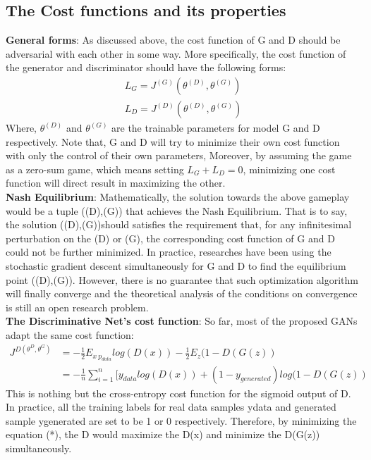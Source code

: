 \documentclass[10pt,twocolumn,letterpaper]{article}
\begin{document}
\subsection{The Cost functions and its properties  }
\textbf{General forms}: As discussed above, the cost function of G and D should be adversarial with each other in some way. More specifically, the cost function of the generator and discriminator should have the following forms:
\begin{align}
L_G = J^{(G)}(\theta^{(D)},\theta^{(G)})\\
L_D = J^{(D)}(\theta^{(D)},\theta^{(G)})
\end{align}
Where, $\theta^{(D)}$ and $\theta^{(G)}$ are the trainable parameters for model G and D respectively. Note that, G and D will try to minimize their own cost function with only the control of their own parameters, Moreover, by assuming the game as a zero-sum game, which means setting $L_G+ L_D =  0$, minimizing one cost function will direct result in maximizing the other.\\

\textbf{Nash Equilibrium}:
Mathematically, the solution towards the above gameplay would be a tuple ((D),(G)) that achieves the Nash Equilibrium. That is to say, the solution ((D),(G))should satisfies the requirement that, for any infinitesimal perturbation on the (D) or  (G), the corresponding cost function of G and D could not be further minimized. In practice, researches have been using the stochastic gradient descent simultaneously for G and D to find the equilibrium point ((D),(G)). However, there is no guarantee that such optimization algorithm will finally converge and the theoretical analysis of the conditions on convergence is still an open research problem.\\
   	
\textbf{The Discriminative Net's cost function}:
So far, most of the proposed GANs adapt the same cost function:
\begin{align}
J^{D(\theta^{D},\theta^G)}&= -\frac{1}{2}E_{x~p_{data}}log(D(x)) -\frac{1}{2}E_z(1 - D(G(z))\\
		       &= -\frac{1}{n}\sum_{i=1}^{n}[y_{data}log(D(x)) + (1 -y_{generated})log(1 -D(G(z))   
\end{align}
This is nothing but the cross-entropy cost function for the sigmoid output of D. In practice, all the training labels for real data samples ydata and generated sample ygenerated are set to be 1 or 0 respectively. Therefore, by minimizing the equation (*), the D would maximize the D(x) and minimize the D(G(z)) simultaneously.\\
\end{document}
